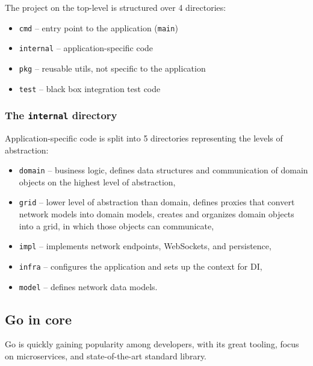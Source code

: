 The project on the top-level is structured over 4 directories:

\begin{itemize}
	\tightlist
	\item
	      \texttt{cmd} -- entry point to the application (\texttt{main})
	\item
	      \texttt{internal} -- application-specific code
	\item
	      \texttt{pkg} -- reusable utils, not specific to the application
	\item
	      \texttt{test} -- black box integration test code
\end{itemize}

\hypertarget{the-internal-directory}{%
	\subsubsection{\texorpdfstring{The \texttt{internal}
		directory}{The internal directory}}\label{the-internal-directory}}

Application-specific code is split into 5 directories representing the
levels of abstraction:

\begin{itemize}
	\tightlist
	\item
	      \texttt{domain} -- business logic, defines data structures and
	      communication of domain objects on the highest level of abstraction,
	\item
	      \texttt{grid} -- lower level of abstraction than domain, defines
	      proxies that convert network models into domain models, creates and
	      organizes domain objects into a grid, in which those objects can
	      communicate,
	\item
	      \texttt{impl} -- implements network endpoints, WebSockets, and
	      persistence,
	\item
	      \texttt{infra} -- configures the application and sets up the context
	      for DI,
	\item
	      \texttt{model} -- defines network data models.
\end{itemize}

\hypertarget{go-in-core}{%
	\subsection{Go in core}\label{go-in-core}}

Go is quickly gaining popularity among developers, with its great
tooling, focus on microservices, and state-of-the-art standard library.

